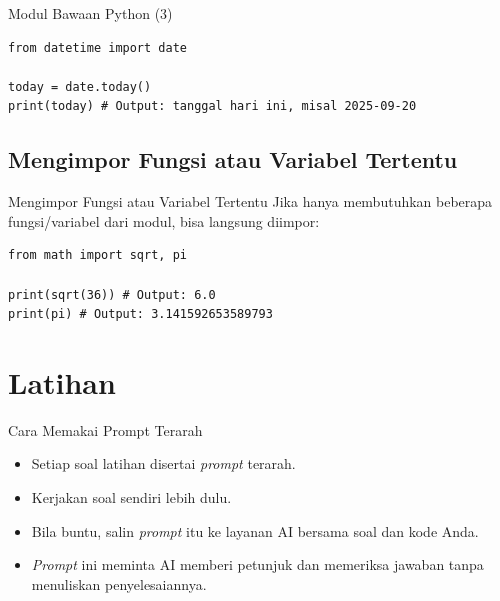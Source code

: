 \documentclass[aspectratio=169, table]{beamer}
\begin{document}
\begin{frame}[fragile]{Modul Bawaan Python (3)}
\begin{lstlisting}[style=PythonStyle, caption={Kode Python: datetime_module.py}]
from datetime import date

today = date.today()
print(today) # Output: tanggal hari ini, misal 2025-09-20
\end{lstlisting}
\end{frame}

\subsection{Mengimpor Fungsi atau Variabel Tertentu}
\begin{frame}[fragile]{Mengimpor Fungsi atau Variabel Tertentu}
Jika hanya membutuhkan beberapa fungsi/variabel dari modul, bisa langsung diimpor:

\begin{lstlisting}[style=PythonStyle]
from math import sqrt, pi

print(sqrt(36)) # Output: 6.0
print(pi) # Output: 3.141592653589793
\end{lstlisting}
\end{frame}

\section{Latihan}
\begin{frame}{Cara Memakai Prompt Terarah}
\begin{itemize}
\item Setiap soal latihan disertai \textit{prompt} terarah.
\item Kerjakan soal sendiri lebih dulu.
\item Bila buntu, salin \textit{prompt} itu ke layanan AI bersama soal dan kode Anda.
\item \textit{Prompt} ini meminta AI memberi petunjuk dan memeriksa jawaban tanpa menuliskan penyelesaiannya.
\end{itemize}
\end{frame}
\end{document}
